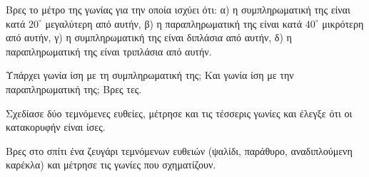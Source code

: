 \ex Βρες το μέτρο της γωνίας για την οποία ισχύει ότι: α) η συμπληρωματική της είναι κατά $20^\circ$ μεγαλύτερη από αυτήν, β) η παραπληρωματική της είναι κατά $40^\circ$ μικρότερη από αυτήν, γ) η συμπληρωματική της είναι διπλάσια από αυτήν, δ) η παραπληρωματική της είναι τριπλάσια από αυτήν.

\ex Υπάρχει γωνία ίση με τη συμπληρωματική της; Και γωνία ίση με την παραπληρωματική της; Βρες τες.


\ex Σχεδίασε δύο τεμνόμενες ευθείες, μέτρησε και τις τέσσερις γωνίες και έλεγξε ότι οι κατακορυφήν είναι ίσες.

\ex Βρες στο σπίτι ένα ζευγάρι τεμνόμενων ευθειών (ψαλίδι, παράθυρο, αναδιπλούμενη καρέκλα) και μέτρησε τις γωνίες που σχηματίζουν.
